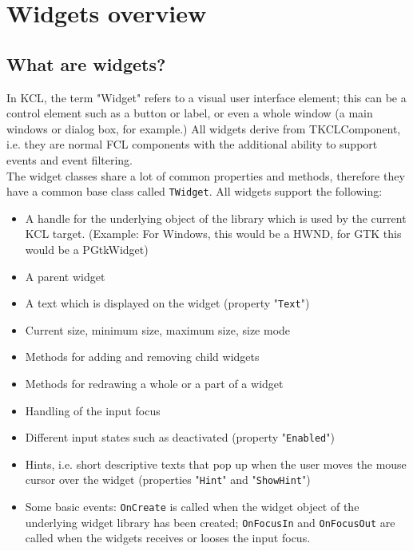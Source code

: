 
\chapter{Widgets overview}


\section{What are widgets?}
In KCL, the term "Widget" refers to a visual user interface element; this can be
a control element such as a button or label, or even a whole window (a main
windows or dialog box, for example.)
All widgets derive from TKCLComponent, i.e. they are normal FCL components
with the additional ability to support events and event filtering.
\\ The widget classes share a lot of common properties and methods, therefore
they have a common base class called \texttt{TWidget}. All widgets support the
following:
\begin{itemize}
\item A handle for the underlying object of the library which is used by the
      current KCL target. (Example: For Windows, this would be a HWND,
      for GTK this would be a PGtkWidget)
\item A parent widget
\item A text which is displayed on the widget (property "\texttt{Text}")
\item Current size, minimum size, maximum size, size mode
\item Methods for adding and removing child widgets
\item Methods for redrawing a whole or a part of a widget
\item Handling of the input focus
\item Different input states such as deactivated (property "\texttt{Enabled}")
\item Hints, i.e. short descriptive texts that pop up when the user moves the
      mouse cursor over the widget (properties "\texttt{Hint}" and
      "\texttt{ShowHint}")
\item Some basic events: \texttt{OnCreate} is called when the widget object
      of the underlying widget library has been created; \texttt{OnFocusIn} and
      \texttt{OnFocusOut} are called when the widgets receives or looses the
      input focus.
\end{itemize}

